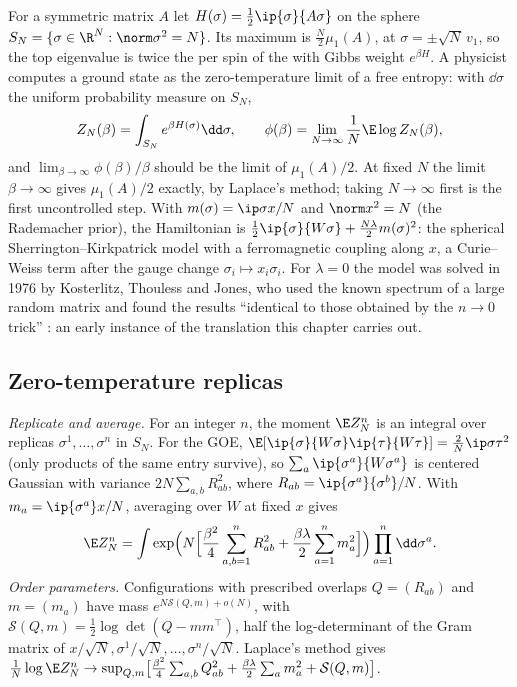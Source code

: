\begin{refsection}
For a symmetric matrix $A$ let $H(\sigma)=\frac12\ip{\sigma}{A\sigma}$ on the sphere $S_N=\{\sigma\in\R^N:\norm\sigma^2=N\}$. Its maximum is $\frac N2\mu_1(A)$, at $\sigma=\pm\sqrt N\,v_1$, so the top eigenvalue is twice the  per spin of the  with Gibbs weight $e^{\beta H}$. A physicist computes a ground state as the zero-temperature limit of a free entropy: with $\dd\sigma$ the uniform probability measure on $S_N$,
\[
Z_N(\beta)=\int_{S_N}e^{\beta H(\sigma)}\dd\sigma,\qquad\phi(\beta)=\lim_{N\to\infty}\frac1N\E\log Z_N(\beta),
\]
and $\lim_{\beta\to\infty}\phi(\beta)/\beta$ should be the limit of $\mu_1(A)/2$. At fixed $N$ the limit $\beta\to\infty$ gives $\mu_1(A)/2$ exactly, by Laplace's method; taking $N\to\infty$ first is the first uncontrolled step. With $m(\sigma)=\ip\sigma x/N$ and $\norm x^2=N$ (the Rademacher prior), the Hamiltonian is $\frac12\ip{\sigma}{W\sigma}+\frac{N\lambda}2m(\sigma)^2$: the spherical Sherrington--Kirkpatrick model with a ferromagnetic coupling along $x$, a Curie--Weiss term after the gauge change $\sigma_i\mapsto x_i\sigma_i$. For $\lambda=0$ the model was solved in 1976 by Kosterlitz, Thouless and Jones, who used the known spectrum of a large random matrix and found the results \enquote{identical to those obtained by the $n\to0$ trick} \parencite{KosterlitzThoulessJones1976}: an early instance of the translation this chapter carries out.

\subsection{Zero-temperature replicas}\label{sec:spiked:replicas}

\begin{heuristic}
\emph{Replicate and average.} For an integer $n$, the moment $\E Z_N^n$ is an integral over replicas $\sigma^1,\dots,\sigma^n$ in $S_N$. For the GOE, $\E[\ip{\sigma}{W\sigma}\ip{\tau}{W\tau}]=\frac2N\ip\sigma\tau^2$ (only products of the same entry survive), so $\sum_a\ip{\sigma^a}{W\sigma^a}$ is centered Gaussian with variance $2N\sum_{a,b}R_{ab}^2$, where $R_{ab}=\ip{\sigma^a}{\sigma^b}/N$. With $m_a=\ip{\sigma^a}x/N$, averaging over $W$ at fixed $x$ gives
\[
\E Z_N^n=\int\exp\Bigl(N\Bigl[\frac{\beta^2}4\sum_{a,b=1}^nR_{ab}^2+\frac{\beta\lambda}2\sum_{a=1}^nm_a^2\Bigr]\Bigr)\prod_{a=1}^n\dd\sigma^a.
\]
\emph{Order parameters.} Configurations with prescribed overlaps $Q=(R_{ab})$ and $m=(m_a)$ have mass $e^{N\mathcal S(Q,m)+o(N)}$, with $\mathcal S(Q,m)=\frac12\log\det(Q-mm^\top)$, half the log-determinant of the Gram matrix of $x/\sqrt N,\sigma^1/\sqrt N,\dots,\sigma^n/\sqrt N$. Laplace's method gives $\frac1N\log\E Z_N^n\to\sup_{Q,m}\bigl[\frac{\beta^2}4\sum_{a,b}Q_{ab}^2+\frac{\beta\lambda}2\sum_am_a^2+\mathcal S(Q,m)\bigr]$.


\end{heuristic}
\end{refsection}
